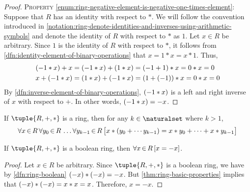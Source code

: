 \begin{proof}
    \vspace{0.3cm}
    \noindent
    \textsc{Property} \ref{enum:ring-negative-element-is-negative-one-times-element}:
    Suppose that \( R \) has an identity with respect to \( \ast \).
    We will follow the convention introduced in \cref{notation:ring-denote-identities-and-inverses-using-arithmetic-symbols}
    and denote the identity of \( R \) with respect to \( \ast \) as \( 1 \).
    Let \( x \in R \) be arbitrary. Since \( 1 \) is the identity of \( R \) with respect to \( \ast \), it follows
    from \cref{dfn:identity-element-of-binary-operations} that \( x = 1 \ast x = x \ast 1 \).
    Thus,
    \begin{align*}
        \mleft( -1 \ast x \mright) + x
        &= \mleft( -1 \ast x \mright) + \mleft( 1 \ast x \mright)
        = \mleft( -1 + 1 \mright) \ast x
        = 0 \ast x
        = 0\\
        x + \mleft( -1 \ast x \mright)
        &= \mleft( 1 \ast x \mright) + \mleft( -1 \ast x \mright)
        = \mleft( 1 + \mleft( -1 \mright) \mright) \ast x
        = 0 \ast x
        = 0
    \end{align*}
    By \cref{dfn:inverse-element-of-binary-operations}, \( \mleft( -1 \ast x \mright) \) is a left and right inverse of \( x \) with respect to \( + \).
    In other words, \( \mleft( -1 \ast x \mright) = -x \).
\end{proof}

\begin{thm}
     \label{thm:ring-generalized-distributive-law}
    If \( \tuple{R, +, \ast} \) is a ring, then for any \( k \in \naturalset \) where \( k > 1 \),
    \begin{equation*}
        \forall x\,{\in}\,R \, \forall y_{0}\,{\in}\,R \, \dots \forall y_{k-1}\,{\in}\,R \,
        \big[ x \ast \mleft( y_{0} + \cdots y_{k-1} \mright)
        = x \ast y_{0} + \cdots + x \ast y_{k-1}
        \big]
    \end{equation*}
\end{thm}

\begin{thm}
    \label{thm:ring-boolean-ring-additive-inverse-of-an-element-is-the-element-itself}
    If \( \tuple{R,+,\ast} \) is a boolean ring, then \( \forall x\,{\in}\,R \, \mleft[ x = -x \mright] \).
\end{thm}

\begin{proof}
    Let \( x \in R \) be arbitrary. Since \( \tuple{R,+,\ast} \) is a boolean ring, we have by \cref{dfn:ring-boolean}
    \( \mleft( -x \mright) \ast \mleft( -x \mright) = -x \). But \cref{thm:ring-basic-properties} implies that
    \( \mleft( -x \mright) \ast \mleft( -x \mright) = x \ast x = x \). Therefore, \( x = -x \).
\end{proof}

